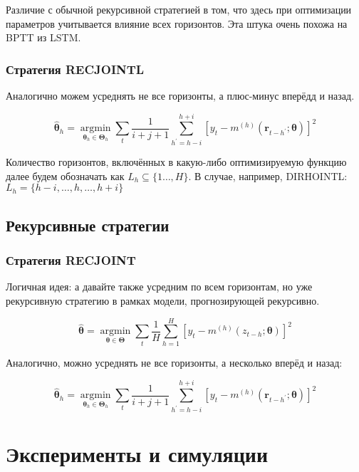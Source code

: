 \documentclass[a4paper,12pt]{article}
\begin{document}
Различие с обычной рекурсивной стратегией в том, что здесь при оптимизации параметров учитывается влияние всех горизонтов. Эта штука очень похожа на BPTT из LSTM.

\subsubsection{Стратегия RECJOINTL}

Аналогично можем усреднять не все горизонты, а плюс-минус вперёдд и назад.

\[
\hat{\boldsymbol{\theta}}_{h}=\underset{\boldsymbol{\theta}_{h} \in \boldsymbol{\Theta}_{h}}{\operatorname{argmin}} \sum_{t} \frac{1}{i+j+1} \sum_{h^{\prime}=h-i}^{h+i}\left[y_{t}-m^{(h)}\left(\boldsymbol{r}_{t-h^{\prime}} ; \boldsymbol{\theta}\right)\right]^{2}
\]

Количество горизонтов, включённых в какую-либо оптимизируемую функцию далее будем обозначать как $L_{h} \subseteq\{1 \ldots, H\}$. В случае, например, DIRHOINTL: $L_{h}=\{h-i, \ldots, h, \ldots, h+i\}$

\subsection{Рекурсивные стратегии}

\subsubsection{Стратегия RECJOINT}

Логичная идея: а давайте также усредним по всем горизонтам, но уже рекурсивную стратегию в рамках модели, прогнозирующей рекурсивно. 

\[
\hat{\boldsymbol{\theta}}=\underset{\boldsymbol{\theta} \in \boldsymbol{\Theta}}{\operatorname{argmin}} \sum_{t} \frac{1}{H} \sum_{h=1}^{H}\left[y_{t}-m^{(h)}\left(z_{t-h} ; \boldsymbol{\theta}\right)\right]^{2}
\]

Аналогично, можно усреднять не все горизонты, а несколько вперёд и назад:

\[
\hat{\boldsymbol{\theta}}_{h}=\underset{\boldsymbol{\theta}_{h} \in \boldsymbol{\Theta}_{h}}{\operatorname{argmin}} \sum_{t} \frac{1}{i+j+1} \sum_{h^{\prime}=h-i}^{h+i}\left[y_{t}-m^{(h)}\left(\boldsymbol{r}_{t-h^{\prime}} ; \boldsymbol{\theta}\right)\right]^{2}
\]


\section{Эксперименты и симуляции}
\end{document}
